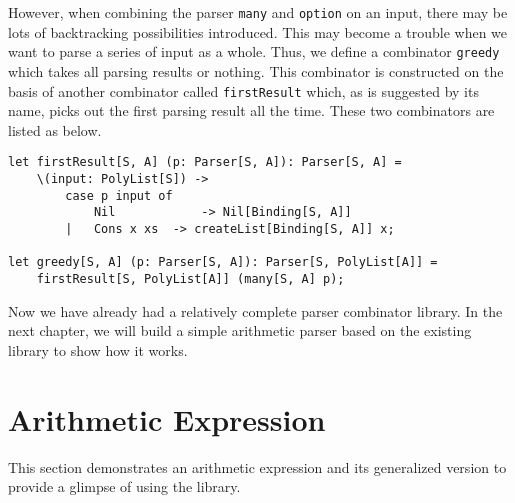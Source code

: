 However, when combining the parser \texttt{many} and \texttt{option} on an input, there may be lots of backtracking possibilities introduced. This may become a trouble when we want to parse a series of input as a whole. Thus, we define a combinator \texttt{greedy} which takes all parsing results or nothing. This combinator is constructed on the basis of another combinator called \texttt{firstResult} which, as is suggested by its name, picks out the first parsing result all the time. These two combinators are listed as below.
\begin{lstlisting}
let firstResult[S, A] (p: Parser[S, A]): Parser[S, A] =
    \(input: PolyList[S]) -> 
        case p input of
            Nil            -> Nil[Binding[S, A]]
        |   Cons x xs  -> createList[Binding[S, A]] x;
                            
let greedy[S, A] (p: Parser[S, A]): Parser[S, PolyList[A]] =
    firstResult[S, PolyList[A]] (many[S, A] p);
\end{lstlisting}
Now we have already had a relatively complete parser combinator library. In the next chapter, we will build a simple arithmetic parser based on the existing library to show how it works.

\section{Arithmetic Expression}
This section demonstrates an arithmetic expression and its generalized version to provide a glimpse of using the library.

